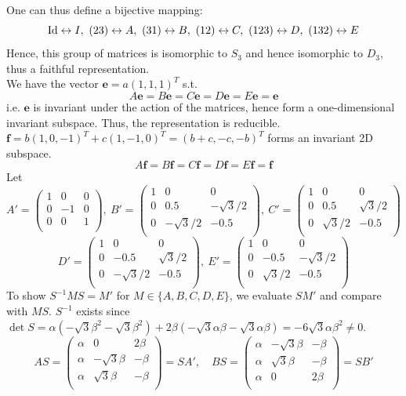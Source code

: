 \documentclass[a4paper]{article}
\begin{document}
\begin{ans}
One can thus define a bijective mapping:
$$\operatorname{Id}\leftrightarrow I,~(23)\leftrightarrow A,~(31)\leftrightarrow B,~(12)\leftrightarrow C,~(123)\leftrightarrow D,~(132)\leftrightarrow E$$
Hence, this group of matrices is isomorphic to $S_3$ and hence isomorphic to $D_3$, thus a faithful representation.\\[5pt]
We have the vector $\mathbf{e}=a(1,1,1)^T$ s.t.
$$A\mathbf{e}=B\mathbf{e}=C\mathbf{e}=D\mathbf{e}=E\mathbf{e}=\mathbf{e}$$
i.e. $\mathbf{e}$ is invariant under the action of the matrices, hence form a one-dimensional invariant subspace. Thus, the representation is reducible.\\[5pt]
$\mathbf{f}=b(1,0,-1)^T+c(1,-1,0)^T=(b+c,-c,-b)^T$ forms an invariant 2D subspace.
$$A\mathbf{f}=B\mathbf{f}=C\mathbf{f}=D\mathbf{f}=E\mathbf{f}=\mathbf{f}$$
Let
$$A'=\begin{pmatrix}1&0&0\\0&-1&0\\0&0&1\\\end{pmatrix},~B'=\begin{pmatrix}1&0&0\\0&0.5&-\sqrt{3}/2\\0&-\sqrt{3}/2&-0.5\\\end{pmatrix},~C'=\begin{pmatrix}1&0&0\\0&0.5&\sqrt{3}/2\\0&\sqrt{3}/2&-0.5\\\end{pmatrix}$$
$$D'=\begin{pmatrix}1&0&0\\0&-0.5&\sqrt{3}/2\\0&-\sqrt{3}/2&-0.5\\\end{pmatrix},~E'=\begin{pmatrix}1&0&0\\0&-0.5&-\sqrt{3}/2\\0&\sqrt{3}/2&-0.5\\\end{pmatrix}$$
To show $S^{-1}MS=M'$ for $M\in\{A,B,C,D,E\}$, we evaluate $SM'$ and compare with $MS$. $S^{-1}$ exists since $\det S=\alpha(-\sqrt{3}\beta^2-\sqrt{3}\beta^2)+2\beta(-\sqrt{3}\alpha\beta-\sqrt{3}\alpha\beta)=-6\sqrt{3}\alpha\beta^2\neq0$.
$$AS=\begin{pmatrix}\alpha&0&2\beta\\\alpha&-\sqrt{3}\beta&-\beta\\\alpha&\sqrt{3}\beta&-\beta\\\end{pmatrix}=SA',\quad BS=\begin{pmatrix}\alpha&-\sqrt{3}\beta&-\beta\\\alpha&\sqrt{3}\beta&-\beta\\\alpha&0&2\beta\\\end{pmatrix}=SB'$$

\end{ans}
\end{document}
